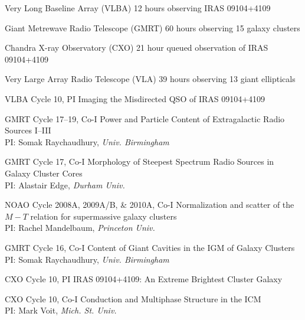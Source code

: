 \documentclass[12pt]{cv}
\begin{document}
\begin{llist}


Very Long Baseline Array (VLBA)
12 hours observing IRAS 09104+4109

Giant Metrewave Radio Telescope (GMRT)
60 hours observing 15 galaxy clusters

Chandra X-ray Observatory (CXO)
21 hour queued observation of IRAS 09104+4109

Very Large Array Radio Telescope (VLA)
39 hours observing 13 giant ellipticals



VLBA Cycle 10, PI
Imaging the Misdirected QSO of IRAS 09104+4109%

GMRT Cycle 17--19, Co-I
Power and Particle Content of Extragalactic Radio Sources I--III\\%
PI: Somak Raychaudhury, {\textit{Univ. Birmingham}}

GMRT Cycle 17, Co-I
Morphology of Steepest Spectrum Radio Sources in Galaxy Cluster Cores\\%
PI: Alastair Edge, {\textit{Durham Univ.}}

NOAO Cycle 2008A, 2009A/B, \& 2010A, Co-I
Normalization and scatter of the $M-T$ relation for supermassive galaxy clusters\\
PI: Rachel Mandelbaum, {\textit{Princeton Univ.}}

GMRT Cycle 16, Co-I
Content of Giant Cavities in the IGM of Galaxy Clusters\\%
PI: Somak Raychaudhury, {\textit{Univ. Birmingham}}

CXO Cycle 10, PI
IRAS 09104+4109: An Extreme Brightest Cluster Galaxy%

CXO Cycle 10, Co-I
Conduction and Multiphase Structure in the ICM\\%
PI: Mark Voit, {\textit{Mich. St. Univ.}}


\end{llist}
\end{document}
